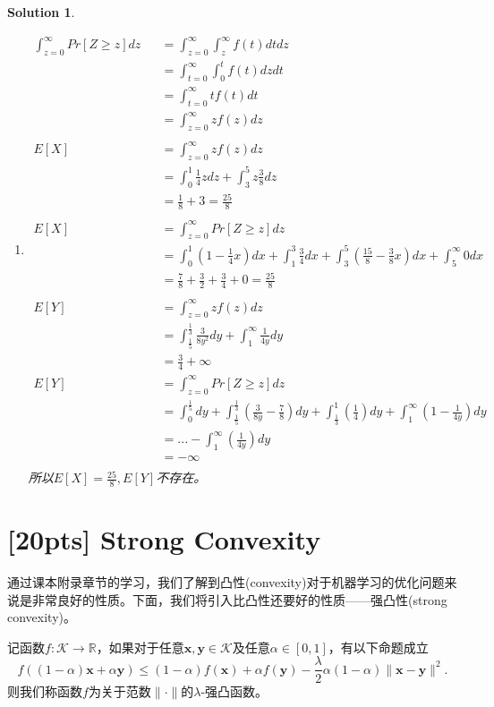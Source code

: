 \documentclass[a4paper,UTF8]{article}
\numberwithin{equation}{section}
\newtheorem*{mySol}{Solution}
\begin{document}
\begin{mySol}
\begin{enumerate}[ {(}1{)}]
\item
\begin{eqnarray*}
	\int^{\infty}_{z=0}{Pr[Z \geq z]dz} 
		&&= \int^{\infty}_{z=0}\int^{\infty}_{z}{f(t)dtdz}\\
		&&= \int^{\infty}_{t=0}\int^t_0{f(t)}dzdt\\
		&&= \int^{\infty}_{t=0}{tf(t)}dt\\
		&&= \int^{\infty}_{z=0}{zf(z)}dz\\
	\\	
	E[X]&&=\int^{\infty}_{z=0}{zf(z)}dz\\
		&&=\int^{1}_{0}{\frac14 z}dz +\int^{5}_{3}{z\frac38}dz\\
		&&=\frac{1}{8} + 3 = \frac{25}{8}\\	
	\\
	E[X]&&=\int^{\infty}_{z=0}{Pr[Z \geq z]dz} \\
		&&=\int^{1}_{0}{(1-\frac{1}{4}x)dx}
		+\int^{3}_{1}{\frac{3}{4}dx}
		+\int^{5}_{3}{(\frac{15}{8}-\frac{3}{8}x)dx}
		+\int^{\infty}_{5}{0dx}\\
		&&=\frac{7}{8}+\frac{3}{2}+\frac{3}{4}+0
		=\frac{25}{8}\\
	\\
	E[Y]&&=\int^{\infty}_{z=0}{zf(z)}dz\\
		&&=\int^{\frac{1}{3}}_{\frac{1}{5}}{\frac{3}{8y^2}}dy 
		+\int^{\infty}_{1}{\frac{1}{4y} dy}\\
		&&=\frac{3}{4}+ \infty
	\\
	E[Y]&&=\int^{\infty}_{z=0}{Pr[Z \geq z]dz} \\
		&&=\int^{\frac{1}{5}}_{0}{dy}
		+\int^{\frac{1}{3}}_{\frac{1}{5}}{(\frac{3}{8y}-\frac{7}{8})dy}
		+\int^{1}_{\frac{1}{3}}{(\frac{1}{4})dy}
		+\int^{\infty}_{1}{(1-\frac{1}{4y})dy}\\
		&&=...-\int^{\infty}_{1}{(\frac{1}{4y})dy}\\
		&&=-\infty\\
\end{eqnarray*}
	所以$E[X]=\frac{25}{8},E[Y]$不存在。
\end{enumerate}

\end{mySol}

\newpage

\section{[20pts] Strong Convexity}
通过课本附录章节的学习，我们了解到凸性(convexity)对于机器学习的优化问题来说是非常良好的性质。下面，我们将引入比凸性还要好的性质——强凸性(strong convexity)。
\begin{def-box}[强凸性]
记函数$f: \mathcal{K} \rightarrow \mathbb{R}$，如果对于任意$\mathbf{x}, \mathbf{y} \in \mathcal{K}$及任意$\alpha\in[0,1]$，有以下命题成立
\begin{equation}
  \label{eq-sc-1}
  f((1-\alpha)\mathbf{x} + \alpha\mathbf{y})\leq (1-\alpha)f(\mathbf{x}) + \alpha f(\mathbf{y}) - \frac{\lambda}{2}\alpha(1-\alpha)\lVert \mathbf{x} - \mathbf{y}\rVert^2.
\end{equation}
则我们称函数$f$为关于范数$\lVert \cdot \rVert$的$\lambda$-强凸函数。
\end{def-box}
\end{document}
